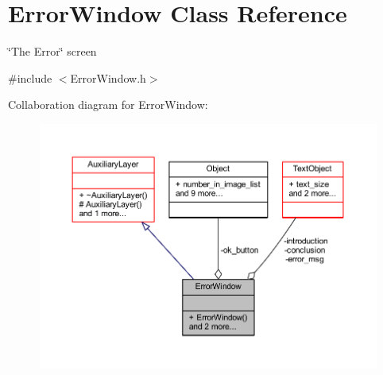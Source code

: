 \hypertarget{class_error_window}{}\section{Error\+Window Class Reference}
\label{class_error_window}


\char`\"{}\+The Error\char`\"{} screen  




{\ttfamily \#include $<$Error\+Window.\+h$>$}



Collaboration diagram for Error\+Window\+:
\nopagebreak
\begin{figure}[H]
\begin{center}
\leavevmode
\includegraphics[width=350pt]{class_error_window__coll__graph}
\end{center}
\end{figure}
